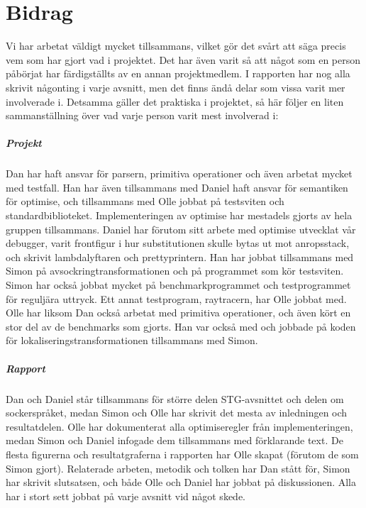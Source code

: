 \documentclass[../Appendix]{subfiles}
\begin{document}
\chapter{Bidrag}

Vi har arbetat väldigt mycket tillsammans, vilket gör det svårt att säga precis
vem som har gjort vad i projektet. Det har även varit så att något som en person
påbörjat har färdigställts av en annan projektmedlem. I rapporten har nog alla
skrivit någonting i varje avsnitt, men det finns ändå delar som vissa varit mer
involverade i. Detsamma gäller det praktiska i projektet, så här följer en
liten sammanställning över vad varje person varit mest involverad i:

\paragraph{Projekt}
Dan har haft ansvar för parsern, primitiva operationer och även arbetat 
mycket med testfall. Han har även tillsammans med Daniel haft ansvar
för semantiken för optimise, och tillsammans med Olle jobbat på testsviten och
standardbiblioteket. Implementeringen av optimise har mestadels
gjorts av hela gruppen tillsammans. Daniel har förutom sitt arbete med optimise 
utvecklat vår debugger, varit frontfigur i hur substitutionen skulle bytas 
ut mot anropsstack, och skrivit lambdalyftaren och prettyprintern. Han har jobbat 
tillsammans med Simon på avsockringtransformationen och 
på programmet som kör testsviten. Simon
har också jobbat mycket på benchmarkprogrammet och testprogrammet
för reguljära uttryck. Ett annat testprogram, raytracern, har Olle jobbat med.
Olle har liksom Dan också arbetat med primitiva operationer, och även kört
en stor del av de benchmarks som gjorts. Han var också med och jobbade på koden för 
lokaliseringstransformationen tillsammans med Simon.


\paragraph{Rapport}
Dan och Daniel står tillsammans för större delen STG-avsnittet och delen om sockerspråket,
medan Simon och Olle har skrivit det mesta av inledningen och resultatdelen. 
Olle har dokumenterat alla optimiseregler från implementeringen,
medan Simon och Daniel infogade dem tillsammans med förklarande text. 
De flesta figurerna och
resultatgraferna i rapporten har Olle skapat (förutom de som Simon gjort).
Relaterade arbeten, metodik och tolken har Dan stått för, Simon har skrivit slutsatsen,
och både Olle och Daniel har jobbat på diskussionen. Alla har i stort sett jobbat på varje
avsnitt vid något skede.
\end{document}
